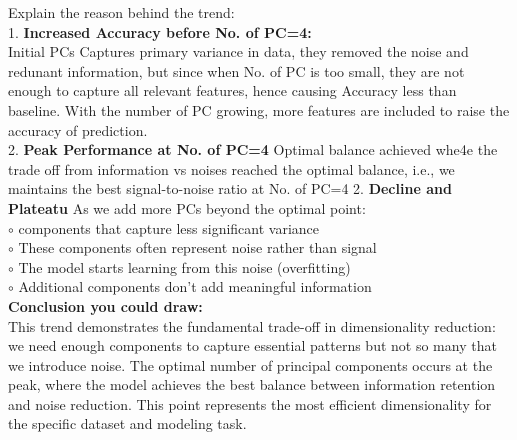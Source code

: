 \documentclass[12pt]{article}
\begin{document}
Explain the reason behind the trend:\\
1. \textbf{Increased Accuracy before No. of PC=4:}\\
  Initial PCs Captures primary variance in data, they removed the noise and redunant information, but since when No. of PC is too small, they are not enough to capture all relevant features, hence causing Accuracy less than baseline. With
  the number of PC growing, more features are included to raise the accuracy of prediction.\\
2. \textbf{Peak Performance at No. of PC=4}
  Optimal balance achieved whe4e the trade off from information vs noises reached the optimal balance, i.e., we maintains the best signal-to-noise ratio at No. of PC=4
2. \textbf{Decline and Plateatu}
As we add more PCs beyond the optimal point: \\
\(\circ\) components that capture less significant variance \\
\(\circ\) These components often represent noise rather than signal \\
\(\circ\) The model starts learning from this noise (overfitting) \\
\(\circ\) Additional components don't add meaningful information \\
\textbf{Conclusion you could draw:} \\
This trend demonstrates the fundamental trade-off in dimensionality reduction: we need enough components to capture essential patterns but not so many that we introduce noise. The optimal number of principal components occurs at the peak, where the model achieves the best balance between information retention and noise reduction. This point represents the most efficient dimensionality for the specific dataset and modeling task.
\end{document}
